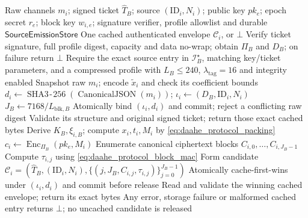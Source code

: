 \begin{algorithm}[t]
\caption{Single-Ciphertext Profile-Bound Encapsulation}
\label{alg:combine_LWE}
\small
\begin{algorithmic}[1]
\Require Raw channels $m_i$; signed ticket $\widehat{T}_B$; source $(\mathrm{ID}_i,N_i)$;
 public key $pk_e$; epoch secret $r_e$; block key $w_{i,e}$; signature verifier,
 profile allowlist and durable $\mathsf{SourceEmissionStore}$
\Ensure One cached authenticated envelope $\mathcal{C}_i$, or $\bot$
\State Verify ticket signature, full profile digest, capacity and data no-wrap;
 obtain $\Pi_B$ and $D_B$; on failure return $\bot$
\State Require the exact source entry in $\mathcal{I}^{\star}_B$,
 matching key/ticket parameters, and a compressed profile with
 $L_B\leq240$, $\lambda_{\mathrm{tag}}=16$ and integrity enabled
\State Snapshot raw $m_i$; encode $\widetilde{x}_i$ and check its coefficient bounds
\State $d_i\gets\operatorname{SHA3\!\text{-}\!256}(\operatorname{CanonicalJSON}(m_i))$;
 $\iota_i\gets(D_B,\mathrm{ID}_i,N_i)$
\State $J_B\gets7168/L_{\mathrm{blk},B}$
\State Atomically bind $(\iota_i,d_i)$ and commit; reject a conflicting raw digest
 \State Validate its structure and original signed ticket; return those exact cached bytes
\EndIf
\State Derive $K_B,\xi_{i,B}$; compute $x_i,t_i,M_i$ by
 \eqref{eq:daahe_protocol_packing}
\State $c_i\gets\operatorname{Enc}_{\Pi_B}(pk_e,M_i)$
\State Enumerate canonical ciphertext blocks $C_{i,0},\ldots,C_{i,J_B-1}$
 \State Compute $\tau_{i,j}$ using \eqref{eq:daahe_protocol_block_mac}
\EndFor
\State Form candidate $\mathcal{C}_i=(\widehat{T}_B,(\mathrm{ID}_i,N_i),
                          \{(j,J_B,C_{i,j},\tau_{i,j})\}_{j=0}^{J_B-1})$
\State Atomically cache-first-wins under $(\iota_i,d_i)$ and commit before release
\State Read and validate the winning cached envelope; return its exact bytes
\Statex Any error, storage failure or malformed cached entry returns $\bot$;
 no uncached candidate is released
\end{algorithmic}
\end{algorithm}

